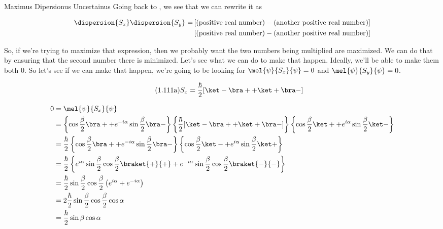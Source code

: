 \begin{answer}
\begin{answerpart}{Maximus Dipersionus Uncertainus}
    Going back to , we see that we can rewrite it as

    \begin{equation}
      \begin{split}
        \dispersion{S_x}\dispersion{S_y} = 
        &\left[(\text{positive real number}) - (\text{another positive real number})\right]\\
        &\left[(\text{positive real number}) - (\text{another positive real number})\right]\\
      \end{split}
    \end{equation}

    So, if we're trying to maximize that expression, then we probably
    want the two numbers being multiplied are maximized.  We can do
    that by ensuring that the second number there is minimized.  Let's
    see what we can do to make that happen.  Ideally, we'll be able to
    make them both 0.  So let's see if we can make that happen, we're
    going to be looking for $\mel{\psi}{S_x}{\psi} = 0$ and
    $\mel{\psi}{S_y}{\psi} = 0$.

    \begin{equation}
      \tag{1.111a}
      S_x = \frac{\hbar}{2} [\ket - \bra + + \ket + \bra - ]
    \end{equation}
    
    \begin{equation}
      \begin{split}
        0
        &= \mel{\psi}{S_x}{\psi}
        \\
        &=
        \left\{\cos{\frac{\beta}{2}} \bra + + e^{-i\alpha}\sin{\frac{\beta}{2}} \bra -\right\}
        \left\{\frac{\hbar}{2} [\ket - \bra + + \ket + \bra - ]\right\}
        \left\{\cos{\frac{\beta}{2}} \ket + + e^{i\alpha}\sin{\frac{\beta}{2}} \ket -\right\}
        \\
        &=
        \frac{\hbar}{2}
        \left\{\cos{\frac{\beta}{2}} \bra + + e^{-i\alpha}\sin{\frac{\beta}{2}} \bra -\right\}
        \left\{\cos{\frac{\beta}{2}} \ket - + e^{i\alpha}\sin{\frac{\beta}{2}} \ket +\right\}
        \\
        &=
        \frac{\hbar}{2}\left\{
        e^{i\alpha}\sin{\frac{\beta}{2}}\cos{\frac{\beta}{2}}\braket{+}{+}
        +
        e^{-i\alpha}\sin{\frac{\beta}{2}}\cos{\frac{\beta}{2}}\braket{-}{-}
        \right\}
        \\
        &=
        \frac{\hbar}{2}
        \sin{\frac{\beta}{2}}\cos{\frac{\beta}{2}}
        \left(e^{i\alpha} + e^{-i\alpha}\right)
        \\
        &=
        2\frac{\hbar}{2}
        \sin{\frac{\beta}{2}}\cos{\frac{\beta}{2}}
        \cos{\alpha}
        \\
        &=
        \frac{\hbar}{2}
        \sin{\beta}
        \cos{\alpha}
        \\
      \end{split}
    \end{equation}


\end{answerpart}
\end{answer}
